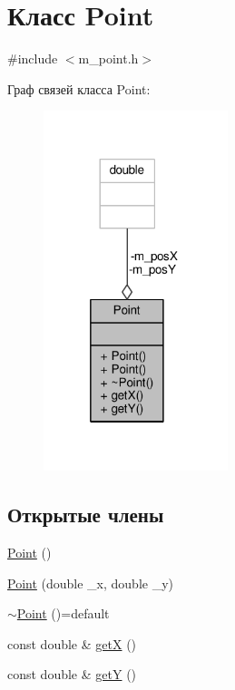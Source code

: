 \hypertarget{class_point}{\section{Класс Point}
\label{class_point}
}


{\ttfamily \#include $<$m\-\_\-point.\-h$>$}



Граф связей класса Point\-:
\nopagebreak
\begin{figure}[H]
\begin{center}
\leavevmode
\includegraphics[width=152pt]{class_point__coll__graph}
\end{center}
\end{figure}
\subsection*{Открытые члены}
\begin{DoxyCompactItemize}
\item 
\hyperlink{class_point_ad92f2337b839a94ce97dcdb439b4325a}{Point} ()
\item 
\hyperlink{class_point_a483cf6bf601889eb922e89f5820045c1}{Point} (double \-\_\-x, double \-\_\-y)
\item 
\hyperlink{class_point_aa1fcbfbf1e997b4f6bd064afeda495f7}{$\sim$\-Point} ()=default
\item 
const double \& \hyperlink{class_point_aca563d76886a7b127077a84586fb055c}{get\-X} ()
\item 
const double \& \hyperlink{class_point_a8a1fb1c5a1201858679a55dd9515f5ae}{get\-Y} ()
\end{DoxyCompactItemize}
